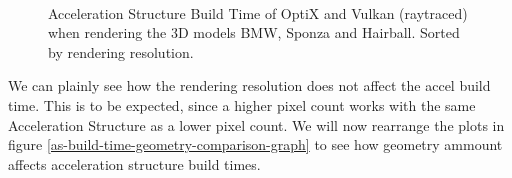 \begin{figure}
    \\
    \centering
    \caption{Acceleration Structure Build Time of OptiX and Vulkan (raytraced) when rendering the 3D models BMW, Sponza and Hairball. Sorted by rendering resolution.}
    \label{as-build-time-comparison-graph}
\end{figure}

We can plainly see how the rendering resolution does not affect the accel build time. This is to be expected, since a higher pixel count works with the same Acceleration Structure as a lower pixel count. We will now rearrange the plots in figure \ref{as-build-time-geometry-comparison-graph} to see how geometry ammount affects acceleration structure build times.

